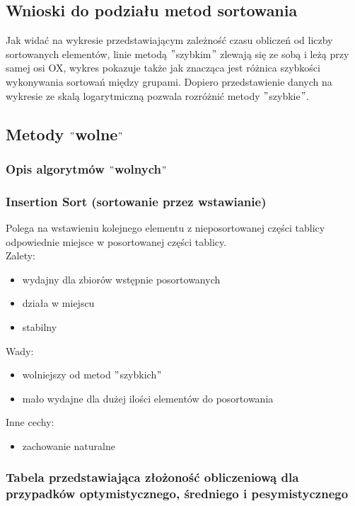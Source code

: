 \documentclass[polish,polish,a4paper]{article}
\begin{document}
\begin{spacing}{1.5}
	\subsection*{Wnioski do podziału metod sortowania}
	
	Jak widać na wykresie przedstawiającym zależność czasu obliczeń od liczby sortowanych elementów, linie metodą  $ " $szybkim$ " $ zlewają się ze sobą i leżą przy samej osi OX, wykres pokazuje także jak znacząca jest różnica szybkości wykonywania sortowań między grupami. Dopiero przedstawienie danych na wykresie ze skalą logarytmiczną pozwala rozróżnić metody $"$szybkie$"$.
	
	\subsection{Metody $ "$wolne$" $}
	\subsubsection{Opis algorytmów $"$wolnych$"$}
	\subsubsection*{Insertion Sort (sortowanie przez wstawianie)}
	Polega na wstawieniu kolejnego elementu z nieposortowanej części tablicy odpowiednie miejsce w posortowanej części tablicy.\\
	
	Zalety:
	\begin{itemize}
		\item wydajny dla zbiorów wstępnie posortowanych
		\item działa w miejscu
		\item stabilny 
	\end{itemize}
	Wady:
	\begin{itemize}
		\item wolniejszy od metod $ " $szybkich$ " $
		\item mało wydajne dla dużej ilości elementów do posortowania
	\end{itemize}
	Inne cechy:
	\begin{itemize}
		\item zachowanie naturalne
	\end{itemize}
	
				\subsubsection*{Tabela przedstawiająca złożoność obliczeniową dla przypadków optymistycznego, średniego i pesymistycznego} 
	

\end{spacing}
\end{document}
